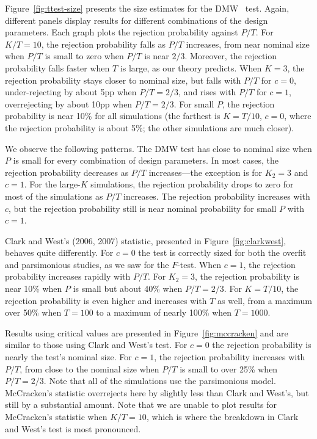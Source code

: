 \documentclass[12pt,draft]{article}
\begin{document}
Figure~\ref{fig:ttest-size} presents the size estimates for the DMW
\oost\ test.  Again, different panels display results for different
combinations of the design parameters.  Each graph plots the rejection
probability against $P/T$.  For $K/T=10$, the rejection probability
falls as $P/T$ increases, from near nominal size when $P/T$ is small
to zero when $P/T$ is near $2/3$.  Moreover, the rejection probability
falls faster when $T$ is large, as our theory predicts.  When $K=3$,
the rejection probability stays closer to nominal size, but falls with
$P/T$ for $c=0$, under-rejecting by about 5pp when $P/T = 2/3$, and
rises with $P/T$ for $c=1$, overrejecting by about 10pp when
$P/T=2/3$.  For small $P$, the rejection probability is near 10\% for
all simulations (the farthest is $K=T/10$, $c=0$, where the rejection
probability is about 5\%; the other simulations are much closer).

We observe the following patterns.  The
DMW test has close to nominal size when $P$ is small for every
combination of design parameters.  In most cases, the rejection
probability decreases as $P/T$ increases---the exception is for $K_2 =
3$ and $c=1$.  For the large-$K$ simulations, the rejection
probability drops to zero for most of the simulations as $P/T$
increases.  The rejection probability increases with $c$, but the
rejection probability still is near nominal probability for small $P$
with $c=1$.

Clark and West's (2006, 2007) statistic, presented in
Figure~\ref{fig:clarkwest}, behaves quite differently.  For $c=0$ the
test is correctly sized for both the overfit and parsimonious studies,
as we saw for the $F$-test.  When $c=1$, the rejection probability
increases rapidly with $P/T$.  For $K_2=3$, the rejection probability
is near 10\% when $P$ is small but about 40\% when $P/T = 2/3$.  For
$K=T/10$, the rejection probability is even higher and increases with
$T$ as well, from a maximum over 50\% when $T=100$ to a maximum of
nearly 100\% when $T=1000$.

Results using  critical values are presented in
Figure~\ref{fig:mccracken} and are similar to those using Clark and
West's test.  For $c=0$ the rejection probability is nearly the test's
nominal size.  For $c=1$, the rejection probability increases with
$P/T$, from close to the nominal size when $P/T$ is small to over 25\%
when $P/T = 2/3$.  Note that all of the simulations use the
parsimonious model.  McCracken's statistic overrejects here by
slightly less than Clark and West's, but still by a substantial
amount. Note that we are unable to plot results for McCracken's
statistic when $K/T = 10$, which is where the breakdown in Clark and
West's test is most pronounced.
\end{document}
